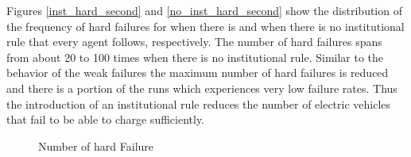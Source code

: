 \documentclass[a4paper]{article}
\begin{document}
Figures \ref{inst_hard_second} and \ref{no_inst_hard_second}  show the distribution of the frequency of hard failures  for 
when there is and when there is no institutional rule that every agent follows, respectively. The number of hard failures spans from
about 20 to 100 times when there is no institutional rule. Similar to the behavior of the weak failures the maximum 
number of hard failures is reduced and there is a portion of the runs which experiences very low failure rates. Thus the introduction
of an institutional rule reduces the number of electric vehicles that fail to be able to charge sufficiently. \\
\begin{figure}[!ht]
\caption{Number of hard Failure}
\label{hard_second}
\end{figure}
\end{document}
